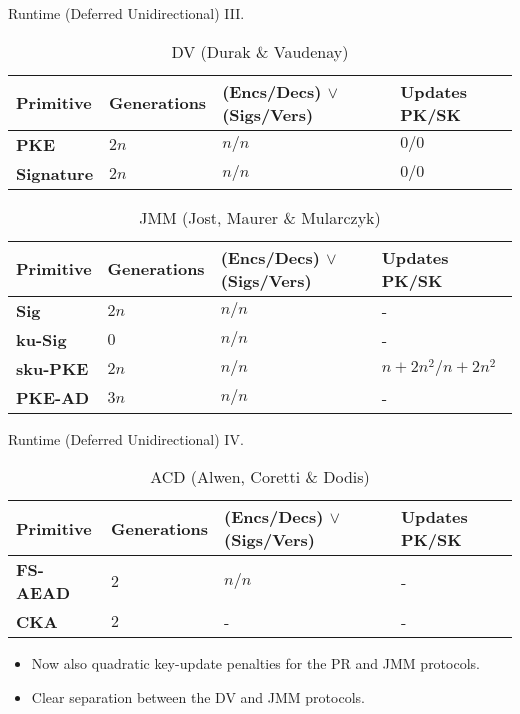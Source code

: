 \documentclass{beamer}
\begin{document}
\begin{frame}{Runtime (Deferred Unidirectional) III.}
  \scriptsize
  \begin{table}
    \caption*{DV (Durak \& Vaudenay)}
    \begin{tabular}{ | l | l | l | l |}
    \hline
    Primitive & Generations & (Encs/Decs) $\vee$ (Sigs/Vers) & Updates PK/SK \\ \hline
    \textbf{PKE} & $2n$ & $n/n$ & $0/0$ \\ \hline
    \textbf{Signature} & $2n$ & $n/n$ & $0/0$ \\  
    \hline
    \end{tabular}
  \end{table}
  \begin{table}
    \caption*{JMM (Jost, Maurer \& Mularczyk)}
    \begin{tabular}{ | l | l | l | l |}
    \hline
    Primitive & Generations & (Encs/Decs) $\vee$ (Sigs/Vers) & Updates PK/SK \\ \hline
    \textbf{Sig} & $2n$ & $n/n$ & - \\ \hline
    \textbf{ku-Sig} & $0$ & $n/n$ & - \\ \hline
    \textbf{sku-PKE} & $2n$ & $n/n$ & $n+2n^2/n+2n^2$ \\ \hline
    \textbf{PKE-AD} & $3n$ & $n/n$ & - \\
    \hline
    \end{tabular}
  \end{table}
\end{frame}

\begin{frame}{Runtime (Deferred Unidirectional) IV.}
  \scriptsize
  \begin{table}
    \caption*{ACD (Alwen, Coretti \& Dodis)}
    \begin{tabular}{ | l | l | l | l |}
    \hline
    Primitive & Generations & (Encs/Decs) $\vee$ (Sigs/Vers) & Updates PK/SK \\ \hline
    \textbf{FS-AEAD} & $2$ & $n/n$ & - \\ \hline
    \textbf{CKA} & $2$ & - & - \\  
    \hline
    \end{tabular}
  \end{table}
  \normalsize
  \begin{itemize}
  \item Now also quadratic key-update penalties for the PR and JMM protocols.
  \item Clear separation between the DV and JMM protocols.
  \end{itemize}
\end{frame}
\end{document}

